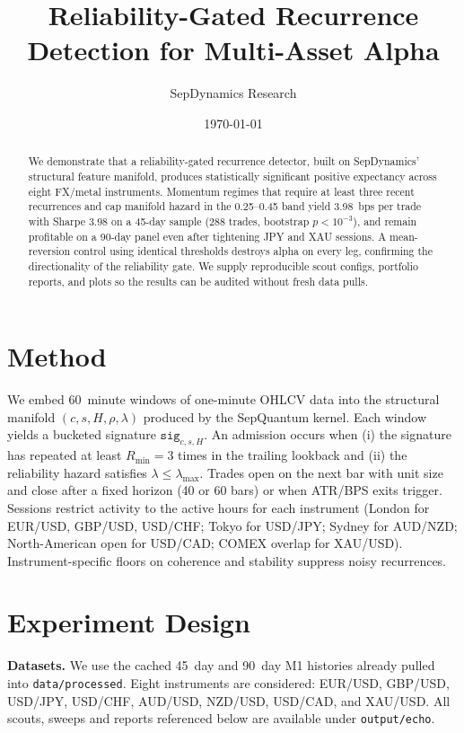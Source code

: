 \documentclass[11pt]{article}
\title{Reliability-Gated Recurrence Detection for Multi-Asset Alpha}
\author{SepDynamics Research}
\date{\today}
\begin{document}
\maketitle

\begin{abstract}
We demonstrate that a reliability-gated recurrence detector, built on SepDynamics' structural feature manifold, produces statistically significant positive expectancy across eight FX/metal instruments. Momentum regimes that require at least three recent recurrences and cap manifold hazard in the 0.25--0.45 band yield \SI{3.98}{bps} per trade with Sharpe \(3.98\) on a 45-day sample (288 trades, bootstrap \(p<10^{-3}\)), and remain profitable on a 90-day panel even after tightening JPY and XAU sessions. A mean-reversion control using identical thresholds destroys alpha on every leg, confirming the directionality of the reliability gate. We supply reproducible scout configs, portfolio reports, and plots so the results can be audited without fresh data pulls.
\end{abstract}

\section{Method}
We embed \SI{60}{minute} windows of one-minute OHLCV data into the structural manifold \((c,s,H,\rho,\lambda)\) produced by the SepQuantum kernel. Each window yields a bucketed signature \(\texttt{sig}_{c,s,H}\). An admission occurs when (i) the signature has repeated at least \(R_{\min}=3\) times in the trailing lookback and (ii) the reliability hazard satisfies \(\lambda \leq \lambda_{\max}\). Trades open on the next bar with unit size and close after a fixed horizon (40 or 60 bars) or when ATR/BPS exits trigger. Sessions restrict activity to the active hours for each instrument (London for EUR/USD, GBP/USD, USD/CHF; Tokyo for USD/JPY; Sydney for AUD/NZD; North-American open for USD/CAD; COMEX overlap for XAU/USD). Instrument-specific floors on coherence and stability suppress noisy recurrences.

\section{Experiment Design}
\textbf{Datasets.} We use the cached \SI{45}{day} and \SI{90}{day} M1 histories already pulled into \texttt{data/processed}. Eight instruments are considered: EUR/USD, GBP/USD, USD/JPY, USD/CHF, AUD/USD, NZD/USD, USD/CAD, and XAU/USD. All scouts, sweeps and reports referenced below are available under \texttt{output/echo}.
\end{document}
